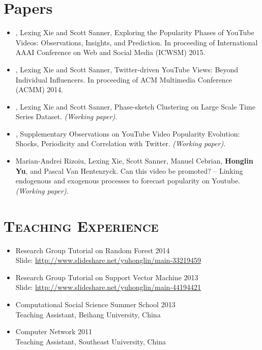 \begin{resume}
\section{Papers}
\begin{itemize}
\item {, Lexing Xie and Scott Sanner}, Exploring the Popularity Phases of YouTube Videos: Observations, Insights, and Prediction. In proceeding of International AAAI Conference on Web and Social Media (ICWSM) 2015.
\item {, Lexing Xie and Scott Sanner}, Twitter-driven YouTube Views: Beyond Individual Influencers. In proceeding of ACM Multimedia Conference (ACMM) 2014.
\item {, Lexing Xie and Scott Sanner}, Phase-sketch Clustering on Large Scale Time Series Dataset. {\it (Working paper)}.
\item {}, Supplementary Observations on YouTube Video Popularity Evolution: Shocks, Periodicity and Correlation with Twitter. {\it (Working paper)}.
\item Marian-Andrei Rizoiu, Lexing Xie, Scott Sanner, Manuel Cebrian, {\bf Honglin Yu}, and Pascal Van Hentenryck. Can this video be promoted? -- Linking endogenous and exogenous processes to forecast popularity on Youtube. {\it (Working paper)}.
\end{itemize} 



\section{\textsc{Teaching Experience}}
\begin{itemize}
\item Research Group Tutorial on Random Forest \hfill 2014 \\
  Slide: \url{http://www.slideshare.net/yuhonglin/main-33219459}
\item Research Group Tutorial on Support Vector Machine \hfill 2013 \\
  Slide: \url{http://www.slideshare.net/yuhonglin/main-44194421}  
  \item Computational Social Science Summer School  \hfill 2013 \\
    Teaching Assistant, Beihang University, China
  \item Computer Network \hfill 2011 \\
    Teaching Assistant, Southeast University, China
\end{itemize} 



\end{resume}
